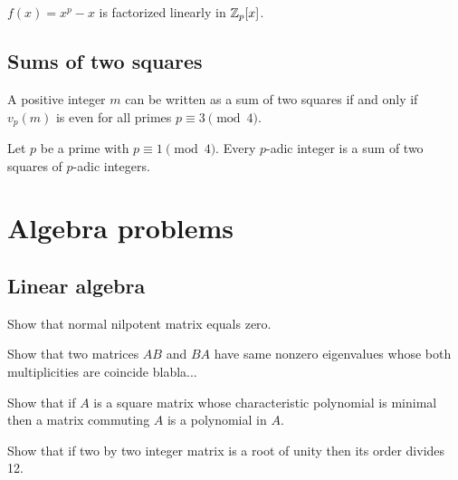 \documentclass[11pt]{article}
\let\realsection\section
\renewcommand\section{\newpage\realsection}
\begin{document}
\begin{ex}
$f(x)=x^p-x$ is factorized linearly in $\mathbb{Z}_p[x]$.
\end{ex}

\subsection{Sums of two squares}


\begin{thm}[Euler]
A positive integer $m$ can be written as a sum of two squares if and only if $v_p(m)$ is even for all primes $p\equiv3\pmod4$.
\end{thm}
\begin{lem}
Let $p$ be a prime with $p\equiv1\pmod4$.
Every $p$-adic integer is a sum of two squares of $p$-adic integers.
\end{lem}













\section{Algebra problems}
\subsection*{Linear algebra}
\begin{cond}
\item Show that normal nilpotent matrix equals zero.
\item Show that two matrices $AB$ and $BA$ have same nonzero eigenvalues whose both multiplicities are coincide blabla...
\item Show that if $A$ is a square matrix whose characteristic polynomial is minimal then a matrix commuting $A$ is a polynomial in $A$.
\item Show that if two by two integer matrix is a root of unity then its order divides 12.
\end{cond}
\end{document}
